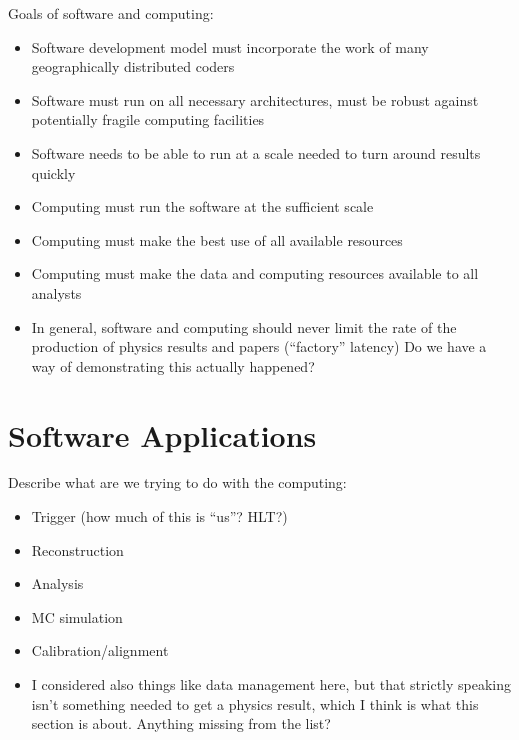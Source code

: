 \documentclass [draft,notitlepage] {article}
\begin{document}
Goals of software and computing:

\begin{itemize}
\item Software development model must incorporate the work of many geographically distributed coders
\item Software must run on all necessary architectures, must be robust against potentially fragile computing facilities
\item Software needs to be able to run at a scale needed to turn around results quickly
\item Computing must run the software at the sufficient scale
\item Computing must make the best use of all available resources
\item Computing must make the data and computing resources available to all analysts
\item In general, software and computing should never limit the rate of the production of physics results and papers (``factory'' latency) Do we have a way of demonstrating this actually happened?
\end{itemize}


\section{Software Applications} 
Describe what are we trying to do with the computing:
\begin{itemize}

\item Trigger (how much of this is ``us''?  HLT?)

\item Reconstruction

\item Analysis

\item MC simulation

\item Calibration/alignment

\item I considered also things like data management here, but that strictly speaking isn't something needed to get a physics result, which I think is what this section is about.  Anything missing from the list?
\end{itemize}
\end{document}
